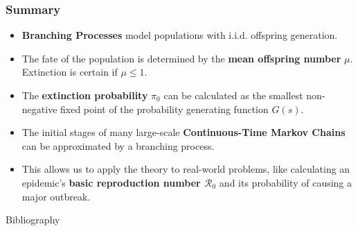 \documentclass[aspectratio=169]{beamer}\usepackage[]{graphicx}\usepackage[]{xcolor}
\begin{document}
\begin{frame}
    \frametitle{Summary}

    \begin{itemize}
        \item \textbf{Branching Processes} model populations with i.i.d. offspring generation.

        \item The fate of the population is determined by the \textbf{mean offspring number} $\mu$. Extinction is certain if $\mu \le 1$.

        \item The \textbf{extinction probability} $\pi_0$ can be calculated as the smallest non-negative fixed point of the probability generating function $G(s)$.

        \item The initial stages of many large-scale \textbf{Continuous-Time Markov Chains} can be approximated by a branching process.

        \item This allows us to apply the theory to real-world problems, like calculating an epidemic's \textbf{basic reproduction number $\mathcal{R}_0$} and its probability of causing a major outbreak.
    \end{itemize}
\end{frame}



\begin{frame}[allowframebreaks]{Bibliography}


\end{frame}
\end{document}
